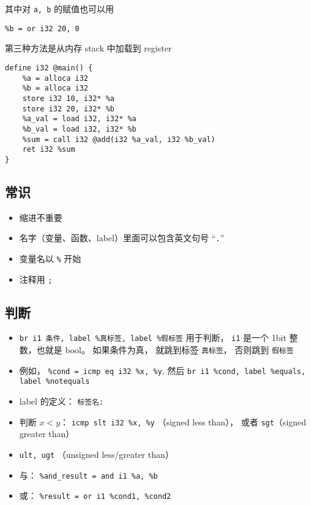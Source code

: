 其中对 \verb`a, b` 的赋值也可以用
\begin{lstlisting}[language=none]
%a = or i32 10, 0
%b = or i32 20, 0
\end{lstlisting}

第三种方法是从内存 stack 中加载到 register
\begin{lstlisting}[language=none]
define i32 @main() {
    %a = alloca i32
    %b = alloca i32
    store i32 10, i32* %a
    store i32 20, i32* %b
    %a_val = load i32, i32* %a
    %b_val = load i32, i32* %b
    %sum = call i32 @add(i32 %a_val, i32 %b_val)
    ret i32 %sum
}
\end{lstlisting}

\subsection{常识}
\begin{itemize}
\item 缩进不重要
\item 名字（变量、函数、label）里面可以包含英文句号 “\verb`.`”
\item 变量名以 \verb`%` 开始
\item 注释用 \verb`;`
\end{itemize}

\subsection{判断}
\begin{itemize}
\item \verb`br i1 条件, label %真标签, label %假标签` 用于判断， \verb`i1` 是一个 1bit 整数，也就是 bool。 如果条件为真， 就跳到标签 \verb`真标签`， 否则跳到 \verb`假标签`
\item 例如， \verb`%cond = icmp eq i32 %x, %y`, 然后 \verb`br i1 %cond, label %equals, label %notequals`
\item label 的定义： \verb`标签名:`
\item 判断 $x < y$： \verb`icmp slt i32 %x, %y` （signed less than）， 或者 \verb`sgt`（signed greater than）
\item \verb`ult, ugt` （unsigned less/greater than）
\item 与： \verb`%and_result = and i1 %a, %b`
\item 或： \verb`%result = or i1 %cond1, %cond2`
\end{itemize}


